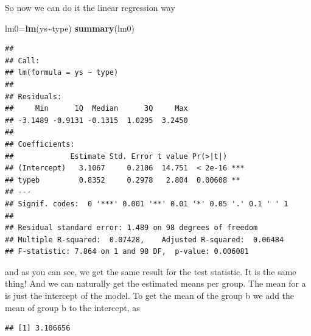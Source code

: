 \documentclass[
]{book}
\newenvironment{Shaded}{\begin{snugshade}}{\end{snugshade}}
\newcommand{\CommentTok}[1]{\textcolor[rgb]{0.56,0.35,0.01}{\textit{#1}}}
\newcommand{\DecValTok}[1]{\textcolor[rgb]{0.00,0.00,0.81}{#1}}
\newcommand{\FunctionTok}[1]{\textcolor[rgb]{0.13,0.29,0.53}{\textbf{#1}}}
\newcommand{\NormalTok}[1]{#1}
\newcommand{\OtherTok}[1]{\textcolor[rgb]{0.56,0.35,0.01}{#1}}
\newcommand{\SpecialCharTok}[1]{\textcolor[rgb]{0.81,0.36,0.00}{\textbf{#1}}}
\begin{document}
So now we can do it the linear regression way

\begin{Shaded}
\begin{Highlighting}[]
\NormalTok{lm0}\OtherTok{=}\FunctionTok{lm}\NormalTok{(ys}\SpecialCharTok{\textasciitilde{}}\NormalTok{type)}
\FunctionTok{summary}\NormalTok{(lm0)}
\end{Highlighting}
\end{Shaded}

\begin{verbatim}
## 
## Call:
## lm(formula = ys ~ type)
## 
## Residuals:
##     Min      1Q  Median      3Q     Max 
## -3.1489 -0.9131 -0.1315  1.0295  3.2450 
## 
## Coefficients:
##             Estimate Std. Error t value Pr(>|t|)    
## (Intercept)   3.1067     0.2106  14.751  < 2e-16 ***
## typeb         0.8352     0.2978   2.804  0.00608 ** 
## ---
## Signif. codes:  0 '***' 0.001 '**' 0.01 '*' 0.05 '.' 0.1 ' ' 1
## 
## Residual standard error: 1.489 on 98 degrees of freedom
## Multiple R-squared:  0.07428,    Adjusted R-squared:  0.06484 
## F-statistic: 7.864 on 1 and 98 DF,  p-value: 0.006081
\end{verbatim}

and as you can see, we get the same result for the test statistic. It is the same thing! And we can naturally get the estimated means per group. The mean for a is just the intercept of the model. To get the mean of the group b we add the mean of group b to the intercept, as

\begin{Shaded}
\end{Shaded}

\begin{verbatim}
## [1] 3.106656
\end{verbatim}

\begin{Shaded}
\end{Shaded}
\end{document}
